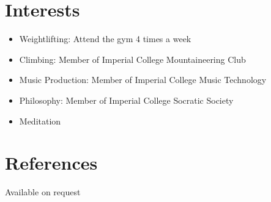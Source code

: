 \documentclass[12pt, margin]{res}
\begin{document}
\begin{resume}
\section{Interests}
\begin{itemize}\itemsep -2pt
\item Weightlifting: Attend the gym 4 times a week
\item Climbing: Member of Imperial College Mountaineering Club
\item Music Production: Member of Imperial College Music Technology
\item Philosophy: Member of Imperial College Socratic Society
\item Meditation
\end{itemize}
\section{References}
Available on request

\end{resume} 
\end{document}
